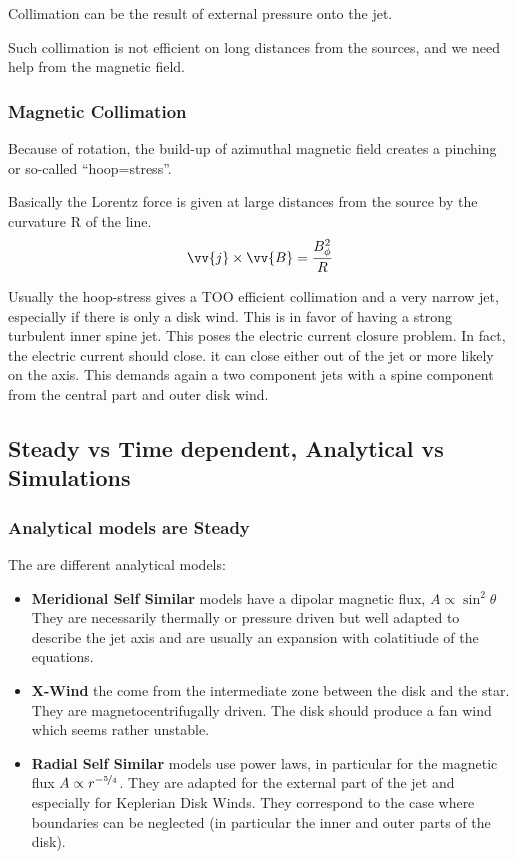 \documentclass[10pt,a4paper,english]{article}
\begin{document}
Collimation can be the result of external pressure onto the jet.


Such collimation is not efficient on long distances from the sources, and we
need help from the magnetic field.

\subsubsection{Magnetic Collimation}

Because of rotation, the build-up of azimuthal magnetic field creates a
pinching or so-called ``hoop=stress''.


Basically the Lorentz force is given at large distances from the source by the
curvature R of the line.
\begin{equation}
    \vv{j} \times \vv{B} = \frac{B^2_{\phi}}{R}
\end{equation}

Usually the hoop-stress gives a TOO efficient collimation and a very narrow
jet, especially if there is only a disk wind. This is in favor of having a
strong turbulent inner spine jet. This poses the electric current closure
problem. In fact, the electric current should close. it can close either out of
the jet or more likely  on the axis. This demands again a two component jets
with a spine component  from the central part and outer disk wind.

\subsection{Steady vs Time dependent, Analytical vs Simulations}

\subsubsection{Analytical models are Steady}

The are different analytical models:
\begin{itemize}
    \item \textbf{Meridional Self Similar} models have a dipolar magnetic flux,
          $A \propto \sin^2\theta$ They are necessarily thermally or pressure
          driven but well adapted to describe the jet axis and are usually an
          expansion with colatitiude of the equations.
    \item \textbf{X-Wind} the come from the intermediate zone between the disk
          and the star. They are magnetocentrifugally driven. The disk should
          produce a fan wind which seems rather unstable.
    \item \textbf{Radial Self Similar} models use power laws, in particular for
          the magnetic flux $A \propto r^{-\nicefrac{5}{4}}$. They are adapted
          for the external part of the jet and especially for Keplerian Disk
          Winds. They correspond to the case where boundaries can be neglected
          (in particular the inner and outer parts of the disk).
\end{itemize}
\end{document}
